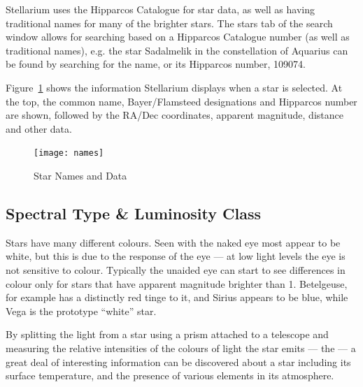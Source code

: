 Stellarium uses the Hipparcos Catalogue for star data, as well as having
traditional names for many of the brighter stars. The stars tab of the
search window allows for searching based on a Hipparcos Catalogue number
(as well as traditional names), e.g. the star Sadalmelik in the
constellation of Aquarius can be found by searching for the name, or
its Hipparcos number, 109074.

%
%

Figure~\ref{fig:starnames} shows the information
Stellarium displays when a star is selected. At the top, the common
name, Bayer/Flamsteed designations and Hipparcos number are shown,
followed by the RA/Dec coordinates, apparent magnitude, distance and
other data.

\begin{figure}[h]
\centering\texttt{[image: names]}
\caption{Star Names and Data}
\label{fig:starnames}
\end{figure}

\subsection{Spectral Type \& Luminosity Class}
\label{sec:Phenomena:SpectralTypeLuminosityClass}

Stars have many different colours. Seen with the naked eye most appear
to be white, but this is due to the response of the eye --- at low
light levels the eye is not sensitive to colour. Typically the unaided
eye can start to see differences in colour only for stars that have
apparent magnitude brighter than 1. Betelgeuse, for example has a
distinctly red tinge to it, and Sirius appears to be blue, while Vega
is the prototype ``white'' star.

By splitting the light from a star using a prism attached to a telescope
and measuring the relative intensities of the colours of light the star
emits --- the  --- a great deal of interesting information
can be discovered about a star including its surface temperature, and
the presence of various elements in its atmosphere.

